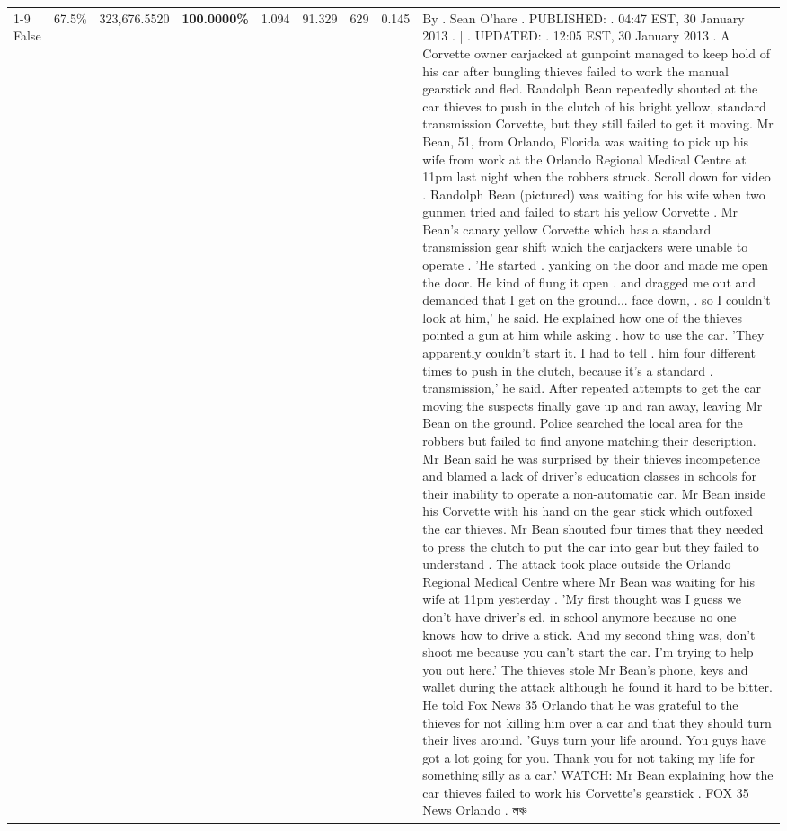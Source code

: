 \begin{table}[H]
\begin{tabular}{lllrlllll}
\cline{1-9} \cline{2-9}
False & 67.5\% & 323,676.5520 & \bfseries \color{red} 100.0000\% & 1.094 & 91.329 & 629 & 0.145 & By . Sean O'hare . PUBLISHED: . 04:47 EST, 30 January 2013 . | . UPDATED: . 12:05 EST, 30 January 2013 . A Corvette owner carjacked at gunpoint managed to keep hold of his car after bungling thieves failed to work the manual gearstick and fled. Randolph Bean repeatedly shouted at the car thieves to push in the clutch of his bright yellow, standard transmission Corvette, but they still failed to get it moving. Mr Bean, 51, from Orlando, Florida was waiting to pick up his wife from work at the Orlando Regional Medical Centre at 11pm last night when the robbers struck. Scroll down for video . Randolph Bean (pictured) was waiting for his wife when two gunmen tried and failed to start his yellow Corvette . Mr Bean's canary yellow Corvette which has a standard transmission gear shift which the carjackers were unable to operate . 'He started . yanking on the door and made me open the door. He kind of flung it open . and dragged me out and demanded that I get on the ground... face down, . so I couldn't look at him,' he said. He explained how one of the thieves pointed a gun at him while asking . how to use the car. 'They apparently couldn't start it. I had to tell . him four different times to push in the clutch, because it's a standard . transmission,' he said. After repeated attempts to get the car moving the suspects finally gave up and ran away, leaving Mr Bean on the ground. Police searched the local area for the robbers but failed to find anyone matching their description. Mr Bean said he was surprised by their thieves incompetence and blamed a lack of driver's education classes in schools for their inability to operate a non-automatic car. Mr Bean inside his Corvette with his hand on the gear stick which outfoxed the car thieves. Mr Bean shouted four times that they needed to press the clutch to put the car into gear but they failed to understand . The attack took place outside the Orlando Regional Medical Centre where Mr Bean was waiting for his wife at 11pm yesterday . 'My first thought was I guess we don't have driver's ed. in school anymore because no one knows how to drive a stick. And my second thing was, don't shoot me because you can't start the car. I'm trying to help you out here.' The thieves stole Mr Bean's phone, keys and wallet during the attack although he found it hard to be bitter. He told Fox News 35 Orlando that he was grateful to the thieves for not killing him over a car and that they should turn their lives around. 'Guys turn your life around. You guys have got a lot going for you. Thank you for not taking my life for something silly as a car.' WATCH: Mr Bean explaining how the car thieves failed to work his Corvette's gearstick . FOX 35 News Orlando . লঞ্চ \\

\end{tabular}
\end{table}
